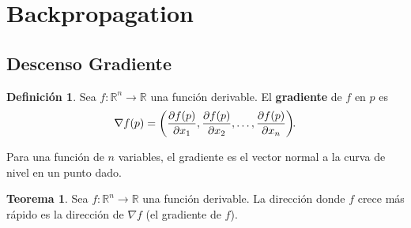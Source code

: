 \documentclass[11pt,letterpaper]{article}
\theoremstyle{definition}
\newtheorem{defi}{Definición}[section]%
\theoremstyle{definition}
\theoremstyle{definition}
\theoremstyle{definition}
\theoremstyle{definition}
\theoremstyle{definition}
\theoremstyle{definition}
\newtheorem{teo}{Teorema}
\theoremstyle{definition}
\begin{document}
\section{Backpropagation}\label{bp}
\subsection{Descenso Gradiente}
\begin{defi}
	Sea $ f: \mathbb{R}^n \to \mathbb{R} $ una función derivable. El \textbf{gradiente} de $ f $  en $ p $ es
	\[ \nabla f (p) =\left(\dfrac{\partial f(p)}{\partial x_1}, \dfrac{\partial f(p)}{\partial x_2}, \dots, \dfrac{\partial f(p)}{\partial x_n}\right)\hspace{-.3em}. \]
\end{defi}
Para una función de $ n $ variables, el gradiente es el vector normal a la curva de nivel en un punto dado.
\begin{teo}
	Sea $ f: \mathbb{R}^n\to \mathbb{R} $ una funci\'on derivable. La direcci\'on donde $ f $ crece m\'as r\'apido es la direcci\'on de $ \nabla f $ (el gradiente de $ f $).
\end{teo}
\end{document}
